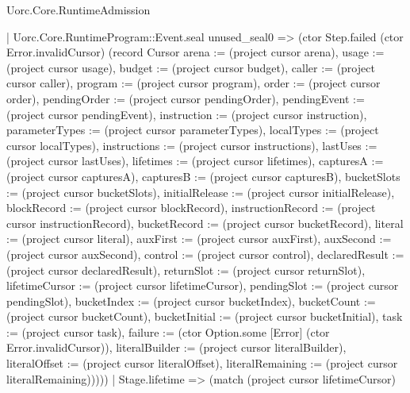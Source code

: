 \begin{lexlean}{Uorc.Core.RuntimeAdmission}
\begin{semanticmodule}
{          | Uorc.Core.RuntimeProgram::Event.seal unused_seal0 => (ctor Step.failed (ctor Error.invalidCursor) (record Cursor {arena := (project cursor arena), usage := (project cursor usage), budget := (project cursor budget), caller := (project cursor caller), program := (project cursor program), order := (project cursor order), pendingOrder := (project cursor pendingOrder), pendingEvent := (project cursor pendingEvent), instruction := (project cursor instruction), parameterTypes := (project cursor parameterTypes), localTypes := (project cursor localTypes), instructions := (project cursor instructions), lastUses := (project cursor lastUses), lifetimes := (project cursor lifetimes), capturesA := (project cursor capturesA), capturesB := (project cursor capturesB), bucketSlots := (project cursor bucketSlots), initialRelease := (project cursor initialRelease), blockRecord := (project cursor blockRecord), instructionRecord := (project cursor instructionRecord), bucketRecord := (project cursor bucketRecord), literal := (project cursor literal), auxFirst := (project cursor auxFirst), auxSecond := (project cursor auxSecond), control := (project cursor control), declaredResult := (project cursor declaredResult), returnSlot := (project cursor returnSlot), lifetimeCursor := (project cursor lifetimeCursor), pendingSlot := (project cursor pendingSlot), bucketIndex := (project cursor bucketIndex), bucketCount := (project cursor bucketCount), bucketInitial := (project cursor bucketInitial), task := (project cursor task), failure := (ctor Option.some [Error] (ctor Error.invalidCursor)), literalBuilder := (project cursor literalBuilder), literalOffset := (project cursor literalOffset), literalRemaining := (project cursor literalRemaining)}))))
      | Stage.lifetime => (match (project cursor lifetimeCursor)
}
\end{semanticmodule}
\end{lexlean}
